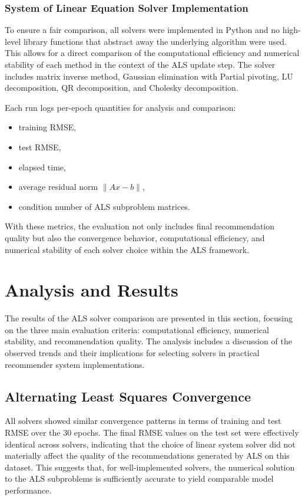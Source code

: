 \documentclass[12pt,a4paper]{report}
\begin{document}
\subsection{System of Linear Equation Solver Implementation}
To ensure a fair comparison, all solvers were implemented in Python and no high-level library functions that abstract away the underlying algorithm were used. This allows for a direct comparison of the computational efficiency and numerical stability of each method in the context of the ALS update step. The solver includes matrix inverse method, Gaussian elimination with Partial pivoting, LU decomposition, QR decomposition, and Cholesky decomposition.

\noindent Each run logs per-epoch quantities for analysis and comparison:
\begin{itemize}
    \item training RMSE,
    \item test RMSE,
    \item elapsed time,
    \item average residual norm $\|Ax-b\|$,
    \item condition number of ALS subproblem matrices.
\end{itemize}

With these metrics, the evaluation not only includes final recommendation quality but also the convergence behavior, computational efficiency, and numerical stability of each solver choice within the ALS framework.

\vspace{4em}

\chapter*{Analysis and Results}

The results of the ALS solver comparison are presented in this section, focusing on the three main evaluation criteria: computational efficiency, numerical stability, and recommendation quality. The analysis includes a discussion of the observed trends and their implications for selecting solvers in practical recommender system implementations.

\section{Alternating Least Squares Convergence}

All solvers showed similar convergence patterns in terms of training and test RMSE over the 30 epochs. The final RMSE values on the test set were effectively identical across solvers, indicating that the choice of linear system solver did not materially affect the quality of the recommendations generated by ALS on this dataset. This suggests that, for well-implemented solvers, the numerical solution to the ALS subproblems is sufficiently accurate to yield comparable model performance.
\end{document}
